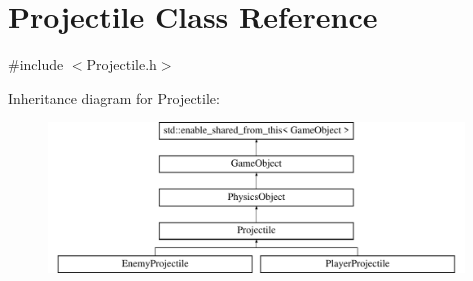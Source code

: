 \hypertarget{class_projectile}{}\section{Projectile Class Reference}
\label{class_projectile}


{\ttfamily \#include $<$Projectile.\+h$>$}

Inheritance diagram for Projectile\+:\begin{figure}[H]
\begin{center}
\leavevmode
\includegraphics[height=4.000000cm]{db/dbe/class_projectile}
\end{center}
\end{figure}
